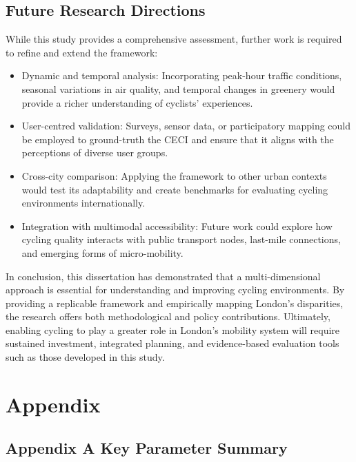 \documentclass[
  12pt,
  oneside]{book}
\providecommand{\tightlist}{%
  \setlength{\itemsep}{0pt}\setlength{\parskip}{0pt}}
\begin{document}
\section{Future Research Directions}\label{future-research-directions}

While this study provides a comprehensive assessment, further work is required to refine and extend the framework:

\begin{itemize}
\tightlist
\item
  Dynamic and temporal analysis: Incorporating peak-hour traffic conditions, seasonal variations in air quality, and temporal changes in greenery would provide a richer understanding of cyclists' experiences.\\
\item
  User-centred validation: Surveys, sensor data, or participatory mapping could be employed to ground-truth the CECI and ensure that it aligns with the perceptions of diverse user groups.\\
\item
  Cross-city comparison: Applying the framework to other urban contexts would test its adaptability and create benchmarks for evaluating cycling environments internationally.\\
\item
  Integration with multimodal accessibility: Future work could explore how cycling quality interacts with public transport nodes, last-mile connections, and emerging forms of micro-mobility.
\end{itemize}

In conclusion, this dissertation has demonstrated that a multi-dimensional approach is essential for understanding and improving cycling environments. By providing a replicable framework and empirically mapping London's disparities, the research offers both methodological and policy contributions. Ultimately, enabling cycling to play a greater role in London's mobility system will require sustained investment, integrated planning, and evidence-based evaluation tools such as those developed in this study.

\printbibliography

\chapter*{Appendix}\label{appendix}

\section*{Appendix A Key Parameter Summary}\label{appendix-a-key-parameter-summary}
\end{document}
